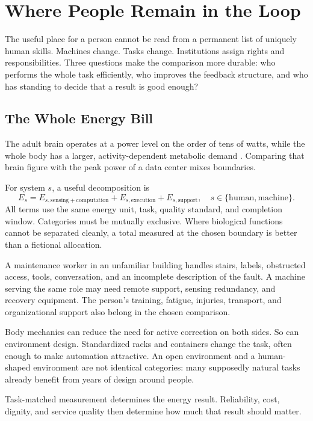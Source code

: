 \section{Where People Remain in the Loop}

The useful place for a person cannot be read from a permanent list of uniquely human skills. Machines change. Tasks change. Institutions assign rights and responsibilities. Three questions make the comparison more durable: who performs the whole task efficiently, who improves the feedback structure, and who has standing to decide that a result is good enough?

\subsection{The Whole Energy Bill}

The adult brain operates at a power level on the order of tens of watts, while the whole body has a larger, activity-dependent metabolic demand \cite{smil2015power}. Comparing that brain figure with the peak power of a data center mixes boundaries.

For system $s$, a useful decomposition is
\begin{equation}
 E_s=E_{s,\mathrm{sensing+computation}}
     +E_{s,\mathrm{execution}}
     +E_{s,\mathrm{support}},
 \quad s\in\{\mathrm{human},\mathrm{machine}\}.
\end{equation}
All terms use the same energy unit, task, quality standard, and completion window. Categories must be mutually exclusive. Where biological functions cannot be separated cleanly, a total measured at the chosen boundary is better than a fictional allocation.

A maintenance worker in an unfamiliar building handles stairs, labels, obstructed access, tools, conversation, and an incomplete description of the fault. A machine serving the same role may need remote support, sensing redundancy, and recovery equipment. The person's training, fatigue, injuries, transport, and organizational support also belong in the chosen comparison.

Body mechanics can reduce the need for active correction on both sides. So can environment design. Standardized racks and containers change the task, often enough to make automation attractive. An open environment and a human-shaped environment are not identical categories: many supposedly natural tasks already benefit from years of design around people.

Task-matched measurement determines the energy result. Reliability, cost, dignity, and service quality then determine how much that result should matter.


